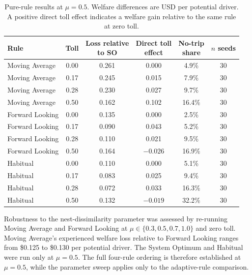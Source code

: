 \documentclass{article}
\begin{document}
\begin{table}[htbp]
\centering
\small
\setlength{\tabcolsep}{4pt}
\begin{tabular}{lccccc}
\toprule
Rule & Toll & \shortstack{Loss relative\\to SO} & \shortstack{Direct toll\\effect} & \shortstack{No-trip\\share} & \shortstack{$n$\\seeds} \\
\midrule
Moving Average & 0.00 & 0.261 & 0.000 & 4.9\% & 30 \\
Moving Average & 0.17 & 0.245 & 0.015 & 7.9\% & 30 \\
Moving Average & 0.28 & 0.230 & 0.027 & 9.7\% & 30 \\
Moving Average & 0.50 & 0.162 & 0.102 & 16.4\% & 30 \\
Forward Looking & 0.00 & 0.135 & 0.000 & 2.5\% & 30 \\
Forward Looking & 0.17 & 0.090 & 0.043 & 5.2\% & 30 \\
Forward Looking & 0.28 & 0.110 & 0.021 & 9.5\% & 30 \\
Forward Looking & 0.50 & 0.164 & $-0.026$ & 16.9\% & 30 \\
Habitual & 0.00 & 0.110 & 0.000 & 5.1\% & 30 \\
Habitual & 0.17 & 0.083 & 0.025 & 9.4\% & 30 \\
Habitual & 0.28 & 0.072 & 0.033 & 16.3\% & 30 \\
Habitual & 0.50 & 0.132 & $-0.019$ & 32.2\% & 30 \\
\bottomrule
\end{tabular}
\caption{Pure-rule results at $\mu = 0.5$. Welfare differences are USD per potential driver. A positive direct toll effect indicates a welfare gain relative to the same rule at zero toll.}
\label{tab:pure-rule-grid}
\end{table}

Robustness to the nest-dissimilarity parameter was assessed by re-running Moving Average and Forward Looking at $\mu \in \{0.3, 0.5, 0.7, 1.0\}$ and zero toll. Moving Average's experienced welfare loss relative to Forward Looking ranges from \$0.125 to \$0.130 per potential driver. The System Optimum and Habitual were run only at $\mu = 0.5$. The full four-rule ordering is therefore established at $\mu = 0.5$, while the parameter sweep applies only to the adaptive-rule comparison.
\end{document}
